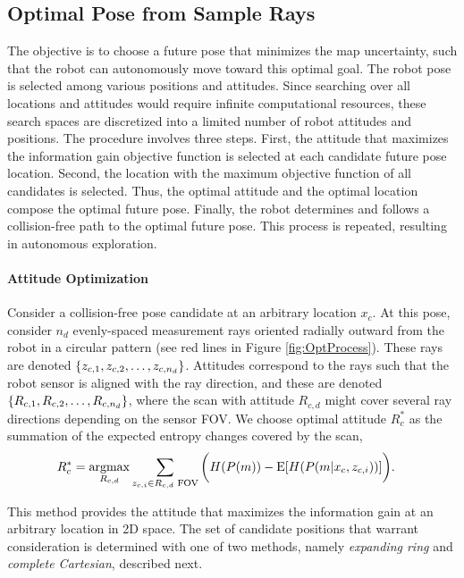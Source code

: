 \subsection{Optimal Pose from Sample Rays}
\label{sec:OptimalPose2DMap}

The objective is to choose a future pose that minimizes the map uncertainty, such that the robot can autonomously move toward this optimal goal. The robot pose is selected among various positions and attitudes. Since searching over all locations and attitudes would require infinite computational resources, these search spaces are discretized into a limited number of robot attitudes and positions.
The procedure involves three steps. First, the attitude that maximizes the information gain objective function is selected at each candidate future pose location. Second, the location with the maximum objective function of all candidates is selected. Thus, the optimal attitude and the optimal location compose the optimal future pose. Finally, the robot determines and follows a collision-free path to the optimal future pose. This process is repeated, resulting in autonomous exploration.

\paragraph{Attitude Optimization}
Consider a collision-free pose candidate at an arbitrary location $x_c$. At this pose, consider $n_d$ evenly-spaced measurement rays oriented radially outward from the robot in a circular pattern (see red lines in Figure \ref{fig:OptProcess}). These rays are denoted $\left\{ z_{c,1},z_{c,2},\ldots,z_{c,n_d} \right\}$. Attitudes correspond to the rays such that the robot sensor is aligned with the ray direction, and these are denoted $\left\{ R_{c,1},R_{c,2},\ldots,R_{c,n_d} \right\}$, where the scan with attitude $R_{c,d}$ might cover several ray directions depending on the sensor FOV. We choose optimal attitude $R_c^*$ as the summation of the expected entropy changes covered by the scan,
\begin{align}
\label{eqn:FindRc}
&R_c^*=\argmax_{R_{c,d}}\sum_{z_{c,i}\in R_{c,d}\text{ FOV}}\bigg(H(P(m))
-\text{E}[H(P(m|x_c,z_{c,i}))]\bigg).
\end{align}

This method provides the attitude that maximizes the information gain at an arbitrary location in 2D space. The set of candidate positions that warrant consideration is determined with one of two methods, namely \emph{expanding ring} and \emph{complete Cartesian}, described next.

